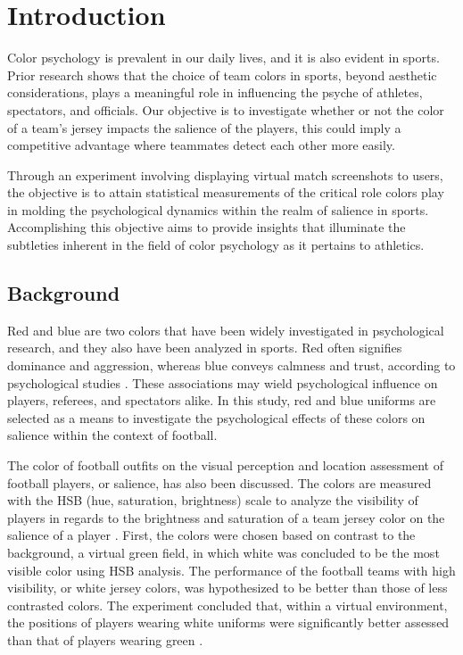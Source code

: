 \section{Introduction}\label{s:intro}

Color psychology is prevalent in our daily lives, and it is also evident in sports. Prior research shows that the choice of team colors in sports, beyond aesthetic considerations, plays a meaningful role in influencing the psyche of athletes, spectators, and officials. Our objective is to investigate whether or not the color of a team's jersey impacts the salience of the players, this could imply a competitive advantage where teammates detect each other more easily. 

Through an experiment involving displaying virtual match screenshots to users, the objective is to attain statistical measurements of the critical role colors play in molding the psychological dynamics within the realm of salience in sports. Accomplishing this objective aims to provide insights that illuminate the subtleties inherent in the field of color psychology as it pertains to athletics. 

\subsection{Background}\label{s:background}

Red and blue are two colors that have been widely investigated in psychological research, and they also have been analyzed in sports. Red often signifies dominance and aggression, whereas blue conveys calmness and trust, according to psychological studies \cite{frontiers}. These associations may wield psychological influence on players, referees, and spectators alike. In this study, red and blue uniforms are selected as a means to investigate the psychological effects of these colors on salience within the context of football. 

The color of football outfits on the visual perception and location assessment of football players, or salience, has also been discussed. The colors are measured with the HSB (hue, saturation, brightness) scale to analyze the visibility of players in regards to the brightness and saturation of a team jersey color on the salience of a player \cite{colors}. First, the colors were chosen based on contrast to the background, a virtual green field, in which white was concluded to be the most visible color using HSB analysis. The performance of the football teams with high visibility, or white jersey colors, was hypothesized to be better than those of less contrasted colors. The experiment concluded that, within a virtual environment, the positions of players wearing white uniforms were significantly better assessed than that of players wearing green \cite{colors}.

